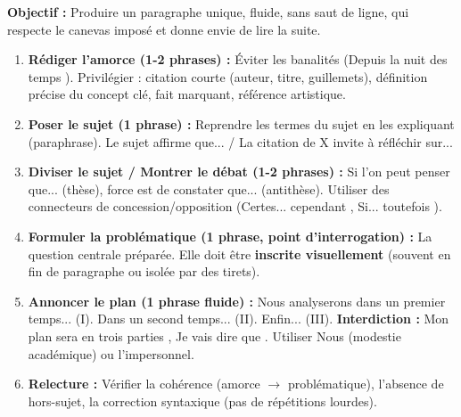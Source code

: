 \documentclass[11pt]{article}
\begin{document}
\begin{methode}
    \textbf{Objectif :} Produire un paragraphe unique, fluide, sans saut de ligne, qui respecte le canevas imposé et donne envie de lire la suite.
    \begin{enumerate}
        \item \textbf{Rédiger l'amorce (1-2 phrases) :} Éviter les banalités (\og Depuis la nuit des temps \fg). Privilégier : citation courte (auteur, titre, guillemets), définition précise du concept clé, fait marquant, référence artistique.
        \item \textbf{Poser le sujet (1 phrase) :} Reprendre les termes du sujet en les expliquant (paraphrase). \og Le sujet affirme que... \fg / \og La citation de X invite à réfléchir sur... \fg
        \item \textbf{Diviser le sujet / Montrer le débat (1-2 phrases) :} \og Si l'on peut penser que... (thèse), force est de constater que... (antithèse). \fg Utiliser des connecteurs de concession/opposition (\og Certes... cependant \fg, \og Si... toutefois \fg).
        \item \textbf{Formuler la problématique (1 phrase, point d'interrogation) :} La question centrale préparée. Elle doit être \textbf{inscrite visuellement} (souvent en fin de paragraphe ou isolée par des tirets).
        \item \textbf{Annoncer le plan (1 phrase fluide) :} \og Nous analyserons dans un premier temps... (I). Dans un second temps... (II). Enfin... (III). \fg \textbf{Interdiction :} \og Mon plan sera en trois parties \fg, \og Je vais dire que \fg. Utiliser \og Nous \fg (modestie académique) ou l'impersonnel.
        \item \textbf{Relecture :} Vérifier la cohérence (amorce $\rightarrow$ problématique), l'absence de hors-sujet, la correction syntaxique (pas de répétitions lourdes).
    \end{enumerate}
\end{methode}
\end{document}
